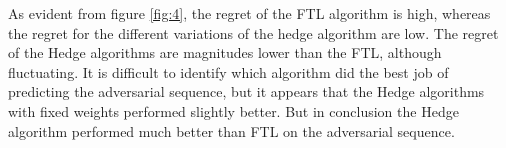 \documentclass{article}
\begin{document}
As evident from figure \ref{fig:4}, the regret of the FTL algorithm is high, whereas the regret for the different variations of the hedge algorithm are low. The regret of the Hedge algorithms are magnitudes lower than the FTL, although fluctuating. It is difficult to identify which algorithm did the best job of predicting the adversarial sequence, but it appears that the Hedge algorithms with fixed weights performed slightly better. But in conclusion the Hedge algorithm performed much better than FTL on the adversarial sequence.
\end{document}
